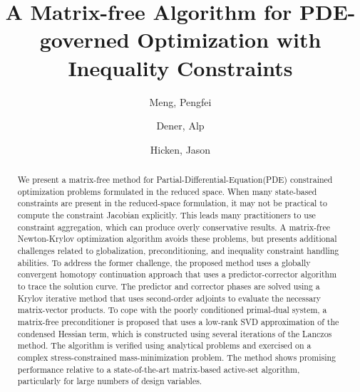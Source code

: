 \documentclass{article}
\date{}
\theoremstyle{definition}
\begin{document}
\title{A Matrix-free Algorithm for PDE-governed Optimization with Inequality Constraints}
\author{
  Meng, Pengfei\\
  \and
  Dener, Alp\\
  \and 
  Hicken, Jason
}
\maketitle
\begin{abstract}
We present a matrix-free method for Partial-Differential-Equation(PDE) constrained optimization problems formulated in the reduced space. When many state-based constraints are present in the reduced-space formulation, it may not be practical to compute the constraint Jacobian explicitly.  This leads many practitioners to use constraint aggregation, which can produce overly conservative results.  A matrix-free Newton-Krylov optimization algorithm avoids these problems, but presents additional challenges related to globalization, preconditioning, and inequality constraint handling abilities. To address the former challenge, the proposed method uses a globally convergent homotopy continuation approach that uses a predictor-corrector algorithm to trace the solution curve. The predictor and corrector phases are solved using a Krylov iterative method that uses second-order adjoints to evaluate the necessary matrix-vector products. To cope with the poorly conditioned primal-dual system, a matrix-free preconditioner is proposed that uses a low-rank SVD approximation of the condensed Hessian term,  which is constructed using several iterations of the Lanczos method. The algorithm is verified using analytical problems and exercised on a complex stress-constrained mass-minimization problem.  The method shows promising performance relative to a state-of-the-art matrix-based active-set algorithm, particularly for large numbers of design variables.
\end{abstract}
\end{document}
